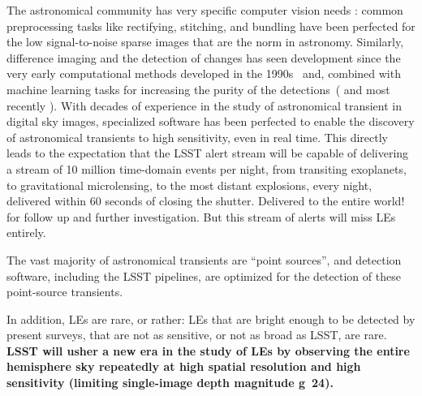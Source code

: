 \documentclass{proposalnsf}
\begin{document}
The astronomical community has very specific computer vision needs : common preprocessing tasks like rectifying, stitching, and bundling have been perfected for the low signal-to-noise sparse images that are the norm in astronomy.  Similarly, difference imaging and the detection of changes has seen development since the very early computational methods developed in the 1990s~\citep{alardlupton99} and, combined with machine learning tasks for increasing the purity of the detections~(\citealt{wozniak13} and most recently \citealt{duev19}).  With decades of experience in the study of astronomical transient in digital sky images, specialized software has been perfected to enable the discovery of astronomical transients to high sensitivity, even in real time.  This directly leads to the expectation that the LSST alert stream will be capable of delivering a stream of 10 million time-domain events per night, from transiting exoplanets, to gravitational microlensing, to the most distant explosions, every night, delivered within 60 seconds of closing the shutter.  Delivered to the entire world! for follow up and further investigation.  But this stream of alerts will miss LEs entirely.

The vast majority of astronomical transients are “point sources”, and detection software, including the LSST pipelines, are optimized for the detection of these point-source transients.



In addition, LEs are rare, or rather: LEs that are bright enough to be detected by present surveys, that are not as sensitive, or not as broad as LSST, are rare.  
{\bf LSST will usher a new era in the study of LEs by observing the entire hemisphere sky repeatedly at high spatial resolution and high sensitivity (limiting single-image depth magnitude g~24).  }
\end{document}
